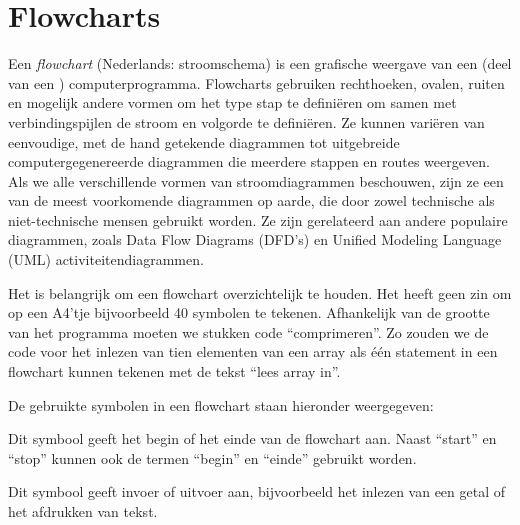\chapter{Flowcharts}
\thispagestyle{empty}
\label{cha:flowcharts}

Een \textsl{flowchart} (Nederlands: stroomschema)
is een grafische weergave van een (deel van een ) computerprogramma.
Flowcharts gebruiken rechthoeken, ovalen, ruiten en mogelijk andere vormen om het type stap te
definiëren om samen met verbindingspijlen de stroom en volgorde te definiëren. Ze
kunnen variëren van eenvoudige, met de hand getekende diagrammen tot uitgebreide
computergegenereerde diagrammen die meerdere stappen en routes weergeven. Als we alle
verschillende vormen van stroomdiagrammen beschouwen, zijn ze een van de meest
voorkomende diagrammen op aarde, die door zowel technische als niet-technische mensen
gebruikt worden. Ze zijn gerelateerd aan andere
populaire diagrammen, zoals Data Flow Diagrams (DFD's) en Unified Modeling Language
(UML) activiteitendiagrammen.

Het is belangrijk om een flowchart overzichtelijk te houden. Het heeft geen zin
om op een A4'tje bijvoorbeeld 40 symbolen te tekenen. Afhankelijk van de grootte
van het programma moeten we stukken code ``comprimeren''. Zo zouden we de code voor
het inlezen van tien elementen van een array als \'e\'en statement in een flowchart
kunnen tekenen met de tekst ``lees array in''.

De gebruikte symbolen in een flowchart staan hieronder weergegeven:

\medskip
\begin{minipage}[c]{0.3\textwidth}
\centering
{}
\end{minipage}\hfill%
\begin{minipage}[c]{0.68\textwidth}
Dit symbool geeft het begin of het einde van de flowchart aan. Naast ``start'' en ``stop'' kunnen ook de termen ``begin'' en ``einde'' gebruikt worden.
\end{minipage}
\bigskip

\begin{minipage}[c]{0.3\textwidth}
\centering
{}
\end{minipage}\hfill%
\begin{minipage}[c]{0.68\textwidth}
Dit symbool geeft invoer of uitvoer aan, bijvoorbeeld het inlezen van een getal of het afdrukken van tekst.\end{minipage}
\bigskip

